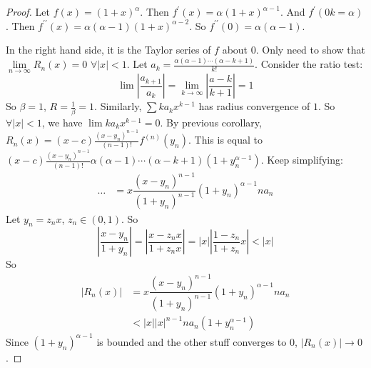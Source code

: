 \documentclass{report}
\begin{document}
\begin{proof}
    Let $f(x) = (1 + x)^{\alpha}$. Then $f^{\prime}(x) = \alpha(1 + x)^{\alpha - 1}$.  And $f^{\prime}(0k = \alpha)$. Then $f^{\prime\prime}(x) = \alpha (\alpha - 1)(1 + x)^{\alpha - 2}$. So $f^{\prime\prime}(0) = \alpha (\alpha - 1)$.

    In the right hand side, it is the Taylor series of $f$ about $0$. Only need to show that $\lim\limits_{n \to \infty} R_{n}(x) = 0$ $\forall \lvert x \rvert < 1$. Let $a_{k} = \frac{\alpha (\alpha - 1) \cdots (\alpha - k + 1)}{k!}$. Consider the ratio test:
        \begin{equation*}
            \lim \left\lvert \dfrac{a_{k + 1}}{a_{k}} \right\rvert = \lim\limits_{k \to \infty} \left\lvert \dfrac{a - k}{k + 1} \right\rvert = 1
        \end{equation*}
    So $\beta = 1$, $R = \frac{1}{\beta} = 1$. Similarly, $\sum ka_{k}x^{k - 1}$ has radius convergence of $1$. So $\forall \lvert x \rvert < 1$, we have $\lim ka_{k}x^{k - 1} =  0$. By previous corollary, $R_{n}(x) = (x - c)\frac{(x - y_{n})^{n - 1}}{(n - 1)!}f^{(n)}(y_{n})$. This is equal to $(x - c)\frac{(x - y_{n})^{n - 1}}{(n - 1)!}\alpha (\alpha - 1)\cdots (\alpha - k + 1)(1 + y_{n}^{\alpha - 1})$. Keep simplifying:   
        \begin{align*}
            \ldots &= x\dfrac{(x - y_{n})^{n - 1}}{(1 + y_{n})^{n - 1}}(1 + y_{n})^{\alpha - 1}na_{n}   
        \end{align*}
    Let $y_{n} = z_{n}x$, $z_{n} \in (0, 1)$. So 
        \begin{equation*}
            \left\lvert \dfrac{x - y_{n}}{1 + y_{n}} \right\rvert = \left\lvert \dfrac{x - z_{n}x}{1 + z_{n}x} \right\rvert = \lvert x \rvert\left\lvert \dfrac{1 - z_{n}}{1 + z_{n}}x \right\rvert < \lvert x \rvert
        \end{equation*}
    So
        \begin{align*}
            \lvert R_{n}(x) \rvert &= x\dfrac{(x - y_{n})^{n - 1}}{(1 + y_{n})^{n - 1}}(1 + y_{n})^{\alpha - 1}na_{n}  \\
                                   &< \lvert x \rvert \lvert x \rvert^{n - 1}na_{n}(1 + y_{n}^{\alpha - 1})
        \end{align*}
    Since $(1 + y_{n})^{\alpha - 1}$ is bounded and the other stuff converges to $0$, $\lvert R_{n}(x) \rvert \rightarrow 0$.
\end{proof}
\end{document}
